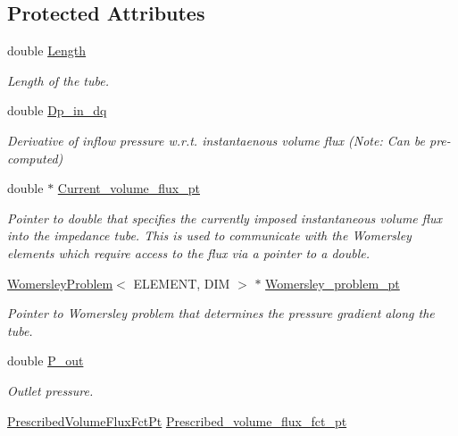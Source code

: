 \subsection*{Protected Attributes}
\begin{DoxyCompactItemize}
\item 
double \hyperlink{classoomph_1_1WomersleyImpedanceTubeBase_a3be3a17477e68ee912699b1cc8749ee7}{Length}
\begin{DoxyCompactList}\small\item\em Length of the tube. \end{DoxyCompactList}\item 
double \hyperlink{classoomph_1_1WomersleyImpedanceTubeBase_a4f6f0c9043ea66a5b0c3a623cf1e7354}{Dp\+\_\+in\+\_\+dq}
\begin{DoxyCompactList}\small\item\em Derivative of inflow pressure w.\+r.\+t. instantaenous volume flux (Note\+: Can be pre-\/computed) \end{DoxyCompactList}\item 
double $\ast$ \hyperlink{classoomph_1_1WomersleyImpedanceTubeBase_a7363d921cd306353eae884b9cfe5c8e9}{Current\+\_\+volume\+\_\+flux\+\_\+pt}
\begin{DoxyCompactList}\small\item\em Pointer to double that specifies the currently imposed instantaneous volume flux into the impedance tube. This is used to communicate with the Womersley elements which require access to the flux via a pointer to a double. \end{DoxyCompactList}\item 
\hyperlink{classoomph_1_1WomersleyProblem}{Womersley\+Problem}$<$ E\+L\+E\+M\+E\+NT, D\+IM $>$ $\ast$ \hyperlink{classoomph_1_1WomersleyImpedanceTubeBase_ab424ec7b47d3f31acd44dcf93be6b5e5}{Womersley\+\_\+problem\+\_\+pt}
\begin{DoxyCompactList}\small\item\em Pointer to Womersley problem that determines the pressure gradient along the tube. \end{DoxyCompactList}\item 
double \hyperlink{classoomph_1_1WomersleyImpedanceTubeBase_afa4f6e203c33d02e82a92986b1aeee0d}{P\+\_\+out}
\begin{DoxyCompactList}\small\item\em Outlet pressure. \end{DoxyCompactList}\item 
\hyperlink{classoomph_1_1WomersleyImpedanceTubeBase_a329107c12ef8f97c5afd4e0ae5d67b70}{Prescribed\+Volume\+Flux\+Fct\+Pt} \hyperlink{classoomph_1_1WomersleyImpedanceTubeBase_ae7d57d4ab999bc30db552a265fbadf92}{Prescribed\+\_\+volume\+\_\+flux\+\_\+fct\+\_\+pt}

\end{DoxyCompactItemize}
